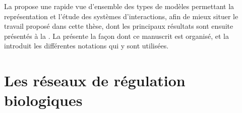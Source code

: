 

La  propose une rapide vue d'ensemble des types de modèles permettant
la représentation et l'étude des systèmes d'interactions,
afin de mieux situer le travail proposé dans cette thèse,
dont les principaux résultats sont ensuite présentés à la .
La  présente la façon dont ce manuscrit est organisé,
et la  introduit les différentes notations qui y sont utilisées.



\section{Les réseaux de régulation biologiques}


\\

